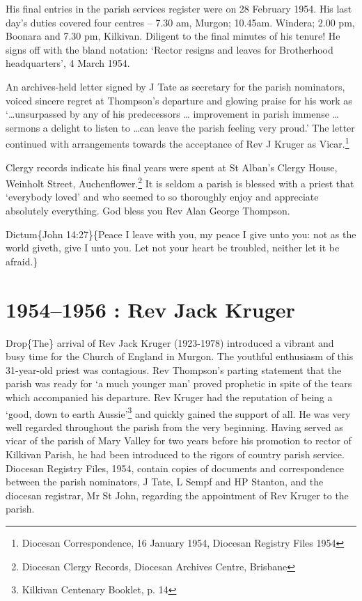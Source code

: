 His final entries in the parish services register were on 28 February 1954. His last day's duties covered four centres -- 7.30 am, Murgon; 10.45am. Windera; 2.00 pm, Boonara and 7.30 pm, Kilkivan. Diligent to the final minutes of his tenure! He signs off with the bland notation: `Rector resigns and leaves for Brotherhood headquarters', 4 March 1954.

An archives-held letter signed by J Tate as secretary for the parish nominators, voiced sincere regret at Thompson's departure and glowing praise for his work as `\ldots unsurpassed by any of his predecessors \ldots{} improvement in parish immense \ldots{} sermons a delight to listen to \ldots can leave the parish feeling very proud.' The letter continued with arrangements towards the acceptance of Rev J Kruger as Vicar.\footnote{Diocesan Correspondence, 16 January 1954, Diocesan Registry Files 1954}

Clergy records indicate his final years were spent at St Alban's Clergy House, Weinholt Street, Auchenflower.\footnote{Diocesan Clergy Records, Diocesan Archives Centre, Brisbane} It is seldom a parish is blessed with a priest that `everybody loved' and who seemed to so thoroughly enjoy and appreciate absolutely everything. God bless you Rev Alan George Thompson.

Dictum\{John 14:27\}\{Peace I leave with you, my peace I give unto you: not as the world giveth, give I unto you. Let not your heart be troubled, neither let it be afraid.\}

\hypertarget{rev-jack-kruger}{%
\chapter{1954--1956 : Rev Jack Kruger}\label{rev-jack-kruger}}

Drop\{The\} arrival of Rev Jack Kruger (1923-1978) introduced a vibrant and busy time for the Church of England in Murgon. The youthful enthusiasm of this 31-year-old priest was contagious. Rev Thompson's parting statement that the parish was ready for `a much younger man' proved prophetic in spite of the tears which accompanied his departure. Rev Kruger had the reputation of being a `good, down to earth Aussie'\footnote{Kilkivan Centenary Booklet, p. 14} and quickly gained the support of all. He was very well regarded throughout the parish from the very beginning. Having served as vicar of the parish of Mary Valley for two years before his promotion to rector of Kilkivan Parish, he had been introduced to the rigors of country parish service. Diocesan Registry Files, 1954, contain copies of documents and correspondence between the parish nominators, J Tate, L Sempf and HP Stanton, and the diocesan registrar, Mr St John, regarding the appointment of Rev Kruger to the parish.

